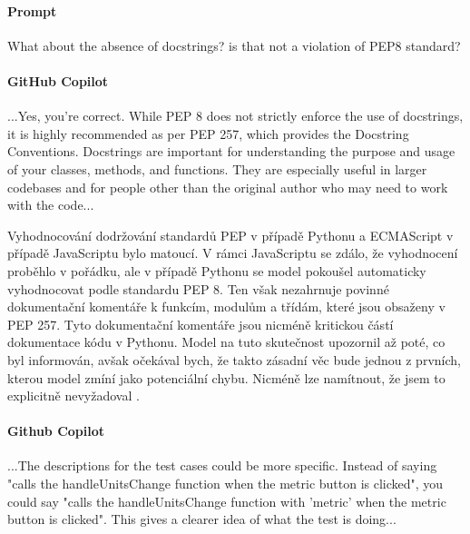 \documentclass[FM,DP]{tulthesis}
\begin{document}
		
		\vspace{0.6em}\begin{tcolorbox}[colback=white,colframe=black]
			\paragraph{Prompt}
			What about the absence of docstrings? is that not a violation of PEP8 standard?
			
			
			\vspace{0.6em}
			
			\paragraph{GitHub Copilot}
			...Yes, you're correct. While PEP 8 does not strictly enforce the use of docstrings, it is highly recommended as per PEP 257, which provides the Docstring Conventions. Docstrings are important for understanding the purpose and usage of your classes, methods, and functions. They are especially useful in larger codebases and for people other than the original author who may need to work with the code... \cite{pep257_fail}
		\end{tcolorbox}
		
		Vyhodnocování dodržování standardů PEP v případě Pythonu a ECMAScript v případě JavaScriptu bylo matoucí. V rámci JavaScriptu se zdálo, že vyhodnocení proběhlo v pořádku, ale v případě Pythonu se model pokoušel automaticky vyhodnocovat podle standardu PEP 8. Ten však nezahrnuje povinné dokumentační komentáře k funkcím, modulům a třídám, které jsou obsaženy v PEP 257. Tyto dokumentační komentáře jsou nicméně kritickou částí dokumentace kódu v Pythonu. Model na tuto skutečnost upozornil až poté, co byl informován, avšak očekával bych, že takto zásadní věc bude jednou z prvních, kterou model zmíní jako potenciální chybu. Nicméně lze namítnout, že jsem to explicitně nevyžadoval \cite{pep257_fail} \cite{PEP} \cite{ES}.
		
		\vspace{0.6em}
		\begin{tcolorbox}[colback=white,colframe=black]
			\paragraph{Github Copilot}
			...The descriptions for the test cases could be more specific. Instead of saying "calls the handleUnitsChange function when the metric button is clicked", you could say "calls the handleUnitsChange function with 'metric' when the metric button is clicked". This gives a clearer idea of what the test is doing... \cite{test_desc}
		\end{tcolorbox}
		
\end{document}
